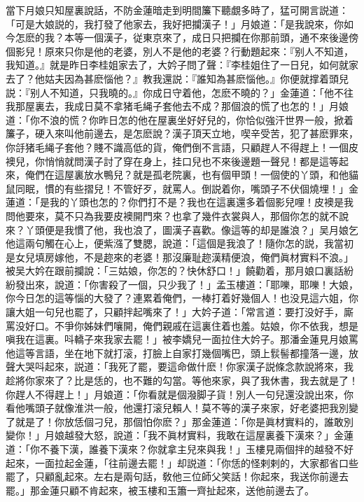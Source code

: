 當下月娘只知屋裏說話，不防金蓮暗走到明間簾下聽覷多時了，猛可開言説道：「可是大娘説的，我打發了他家去，我好把攔漢子！」月娘道：「是我說來，你如今怎麽的我？本等一個漢子，従東京來了，成日只把攔在你那前頭，通不來後邊傍個影兒！原來只你是他的老婆，別人不是他的老婆？行動題起來：『别人不知道，我知道。』就是昨日李桂姐家去了，大妗子問了聲：『李桂姐住了一日兒，如何就家去了？他姑夫因為甚麽惱他？』教我還説：『誰知為甚麽惱他。』你便就撑着頭兒説：『别人不知道，只我曉的。』你成日守着他，怎麽不曉的？」金蓮道：「他不往我那屋裏去，我成日莫不拿猪毛䋲子套他去不成？那個浪的慌了也怎的！」月娘道：「你不浪的慌？你昨日怎的他在屋裏坐好好兒的，你恰似強汗世界一般，掀着簾子，硬入來叫他前邊去，是怎麽說？漢子頂天立地，喫辛受苦，犯了甚麽罪來，你㧱猪毛䋲子套他？賤不識高低的貨，俺們倒不言語，只顧趕人不得趕上！一個皮襖兒，你悄悄就問漢子討了穿在身上，挂口兒也不來後邊題一聲兒！都是這等起來，俺們在這屋裏放水鴨兒？就是孤老院裏，也有個甲頭！一個使的丫頭，和他貓鼠同眠，慣的有些摺兒！不管好歹，就罵人。倒説着你，嘴頭子不伏個燒埋！」金蓮道：「是我的丫頭也怎的？你們打不是？我也在這裏還多着個影兒哩！皮襖是我問他要來，莫不只為我要皮襖開門來？也拿了幾件衣裳與人，那個你怎的就不說來？丫頭便是我慣了他，我也浪了，圖漢子喜歡。像這等的却是誰浪？」吴月娘乞他這兩句觸在心上，便紫漒了雙腮，說道：「這個是我浪了！隨你怎的説，我當初是女兒填房嫁他，不是趂來的老婆！那沒廉耻趂漢精便浪，俺們眞材實料不浪。」被吴大妗在跟前攔說：「三姑娘，你怎的？快休舒口！」饒勸着，那月娘口裏話紛紛發出來，說道：「你害殺了一個，只少我了！」孟玉樓道：「耶嚛，耶嚛！大娘，你今日怎的這等惱的大發了？連累着俺們，一棒打着好幾個人！也没見這六姐，你讓大姐一句兒也罷了，只顧拌起嘴來了！」大妗子道：「常言道：要打没好手，廝罵没好口。不爭你姊妹們嚷開，俺們親戚在這裏住着也羞。姑娘，你不依我，想是嗔我在這裏。呌轎子來我家去罷！」被李嬌兒一面拉住大妗子。那潘金蓮見月娘罵他這等言語，坐在地下就打滚，打臉上自家打幾個嘴巴，頭上䯼髻都撞落一邊，放聲大哭呌起來，説道：「我死了罷，要這命做什麽！你家漢子説條念款說將來，我趁將你家來了？比是恁的，也不難的勾當。等他來家，與了我休書，我去就是了！你趕人不得趕上！」月娘道：「你看就是個潑脚子貨！別人一句兒還没說出來，你看他嘴頭子就像淮洪一般，他還打滚兒賴人！莫不等的漢子來家，好老婆把我別變了就是了！你放恁個刁兒，那個怕你麽？」那金蓮道：「你是眞材實料的，誰敢別變你！」月娘越發大怒，說道：「我不眞材實料，我敢在這屋裏養下漢來？」金蓮道：「你不養下漢，誰養下漢來？你就拿主兒來與我！」玉樓見兩個拌的越發不好起來，一面拉起金蓮，「往前邊去罷！」却説道：「你恁的怪剌剌的，大家都省口些罷了，只顧亂起來。左右是兩句話，敎他三位師父笑話！你起來，我送你前邊去罷。」那金蓮只顧不肯起來，被玉樓和玉簫一齊扯起來，送他前邊去了。

